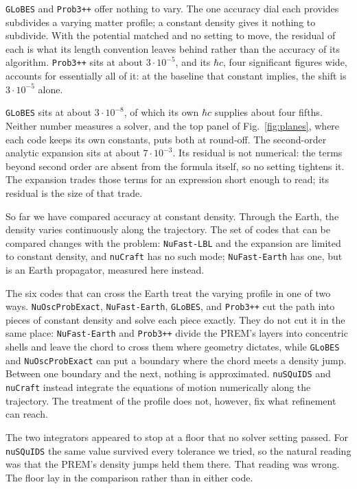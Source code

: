 \documentclass[final,5p,times,twocolumn,sort,compress]{elsarticle}
\newcommand{\fig}{Fig.}
\newcommand{\figu}[1]{\fig~\ref{fig:#1}}
\begin{document}
{\tt GLoBES} and {\tt Prob3++} offer nothing to vary.  The one accuracy dial each provides subdivides a varying matter profile; a constant density gives it nothing to subdivide.  With the potential matched and no setting to move, the residual of each is what its length convention leaves behind rather than the accuracy of its algorithm.  {\tt Prob3++} sits at about $3 \cdot 10^{-5}$, and its $\hbar c$, four significant figures wide, accounts for essentially all of it: at the baseline that constant implies, the shift is $3 \cdot 10^{-5}$ alone.

{\tt GLoBES} sits at about $3 \cdot 10^{-8}$, of which its own $\hbar c$ supplies about four fifths.  Neither number measures a solver, and the top panel of \figu{planes}, where each code keeps its own constants, puts both at round-off.  The second-order analytic expansion sits at about $7 \cdot 10^{-3}$.  Its residual is not numerical: the terms beyond second order are absent from the formula itself, so no setting tightens it.  The expansion trades those terms for an expression short enough to read; its residual is the size of that trade.

So far we have compared accuracy at constant density.  Through the Earth, the density varies continuously along the trajectory.  The set of codes that can be compared changes with the problem: {\tt NuFast-LBL} and the expansion are limited to constant density, and {\tt nuCraft} has no such mode; {\tt NuFast-Earth} has one, but is an Earth propagator, measured here instead.

The six codes that can cross the Earth treat the varying profile in one of two ways.  {\tt NuOscProbExact}, {\tt NuFast-Earth}, {\tt GLoBES}, and {\tt Prob3++} cut the path into pieces of constant density and solve each piece exactly.  They do not cut it in the same place: {\tt NuFast-Earth} and {\tt Prob3++} divide the PREM's layers into concentric shells and leave the chord to cross them where geometry dictates, while {\tt GLoBES} and {\tt NuOscProbExact} can put a boundary where the chord meets a density jump.  Between one boundary and the next, nothing is approximated.  {\tt nuSQuIDS} and {\tt nuCraft} instead integrate the equations of motion numerically along the trajectory.  The treatment of the profile does not, however, fix what refinement can reach.

The two integrators appeared to stop at a floor that no solver setting passed.  For {\tt nuSQuIDS} the same value survived every tolerance we tried, so the natural reading was that the PREM's density jumps held them there.  That reading was wrong.  The floor lay in the comparison rather than in either code.
\end{document}
